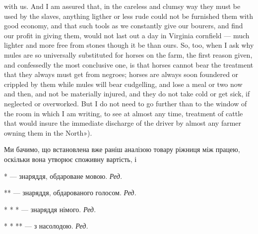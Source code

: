 {with us. And I am assured that, in the careless and clumsy way they must
be used by the slaves, anything ligther or less rude could not be furnished
them with good economy, and that such tools as we constantly give our
bourers, and find our profit in giving them, would not last out a day in
Virginia cornfield — much lighter and more free from stones though it be
than ours. So, too, when I ask why mules are so universally substituted for
horses on the farm, the first reason given, and confessedly the most conclusive
one, is that horses cannot bear the treatment that they always must get
from negroes; horses are always soon foundered or crippled by them while
mules will bear cudgelling, and lose a meal or two now and then, and not
be materially injured, and they do not take cold or get sick, if neglected
or overworked. But I do not need to go further than to the window of the room
in which I am writing, to see at almost any time, treatment of cattle
that would insure the immediate discharge of the driver by almost any farmer
owning them in the North»).
}

Ми бачимо, що встановлена вже раніш аналізою товару ріжниця
між працею, оскільки вона утворює споживну вартість, і

* — знаряддя, обдароване мовою. \emph{Ред.}

** — знаряддя, обдарованого голосом. \emph{Ред.}

* * * — знаряддя німого. \emph{Ред.}

* * ** — з насолодою. \emph{Ред.}
